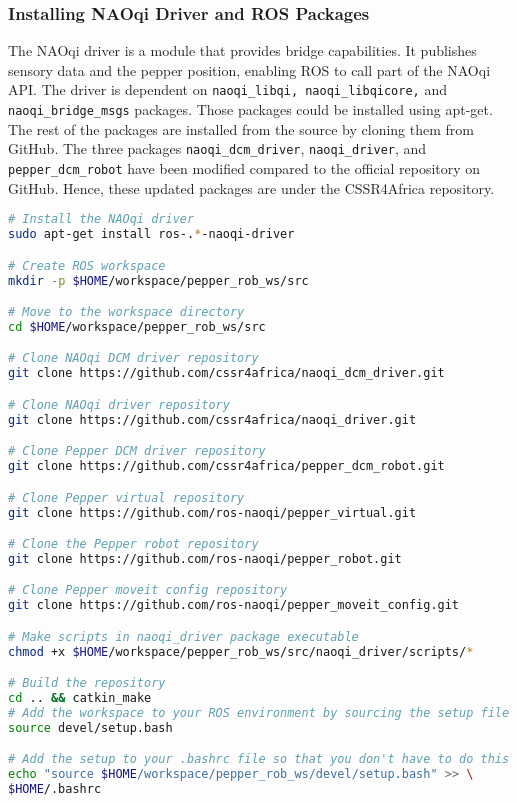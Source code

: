\documentclass{CSSRforAfrica}
\begin{document}
{\subsubsection*{Installing NAOqi Driver and ROS Packages}

The NAOqi driver is a module that provides bridge capabilities. It publishes sensory data and the pepper position, enabling ROS to call part of the NAOqi API. The driver is dependent on \texttt{naoqi\_libqi, naoqi\_libqicore,} and \texttt{naoqi\_bridge\_msgs} packages. Those packages could be installed using apt-get. The rest of the packages are installed from the source by cloning them from GitHub. The three packages \texttt{naoqi\_dcm\_driver}, \texttt{naoqi\_driver}, and \texttt{pepper\_dcm\_robot} have been modified compared to the official repository on GitHub. Hence, these updated packages are under the CSSR4Africa repository.

\begin{lstlisting}[style=withoutNumbering, language=bash]
# Install the NAOqi driver
sudo apt-get install ros-.*-naoqi-driver

# Create ROS workspace
mkdir -p $HOME/workspace/pepper_rob_ws/src

# Move to the workspace directory
cd $HOME/workspace/pepper_rob_ws/src

# Clone NAOqi DCM driver repository
git clone https://github.com/cssr4africa/naoqi_dcm_driver.git

# Clone NAOqi driver repository
git clone https://github.com/cssr4africa/naoqi_driver.git

# Clone Pepper DCM driver repository
git clone https://github.com/cssr4africa/pepper_dcm_robot.git

# Clone Pepper virtual repository
git clone https://github.com/ros-naoqi/pepper_virtual.git

# Clone the Pepper robot repository
git clone https://github.com/ros-naoqi/pepper_robot.git

# Clone Pepper moveit config repository
git clone https://github.com/ros-naoqi/pepper_moveit_config.git

# Make scripts in naoqi_driver package executable
chmod +x $HOME/workspace/pepper_rob_ws/src/naoqi_driver/scripts/*

# Build the repository
cd .. && catkin_make
# Add the workspace to your ROS environment by sourcing the setup file in the devel folder
source devel/setup.bash

# Add the setup to your .bashrc file so that you don't have to do this every time you open a new terminal
echo "source $HOME/workspace/pepper_rob_ws/devel/setup.bash" >> \
$HOME/.bashrc


\end{lstlisting}}
\end{document}
